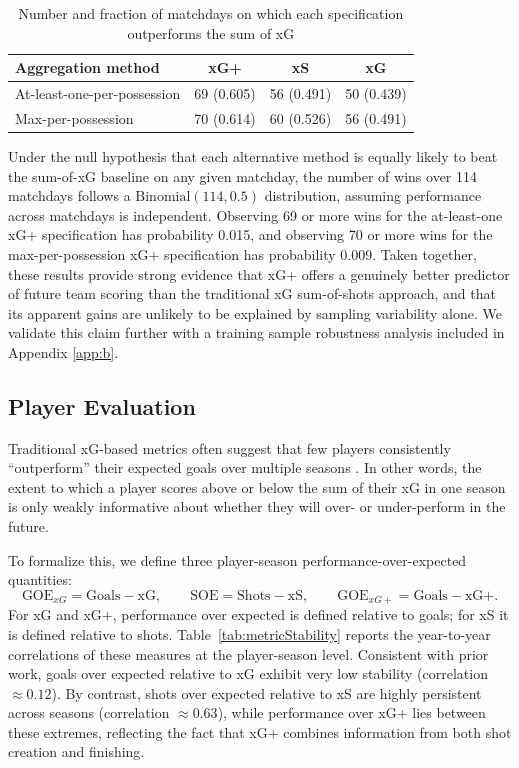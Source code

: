 \documentclass[12pt,letterpaper]{article}
\begin{document}
\begin{table}[ht]
\centering
\caption{Number and fraction of matchdays on which each specification outperforms the sum of xG}
\label{tab:fraction_better_than_xGsum}
\begin{tabular}{lccc}
\toprule
\textbf{Aggregation method} & \textbf{xG+} & \textbf{xS} & \textbf{xG} \\
\midrule
At-least-one-per-possession & 69 (0.605) & 56 (0.491) & 50 (0.439) \\
Max-per-possession          & 70 (0.614) & 60 (0.526) & 56 (0.491) \\
\bottomrule
\end{tabular}
\end{table}


Under the null hypothesis that each alternative method is equally likely to beat the sum-of-xG baseline on any given matchday, the number of wins over 114 matchdays follows a $\text{Binomial}(114, 0.5)$ distribution, assuming performance across matchdays is independent. Observing 69 or more wins for the at-least-one xG+ specification has probability 0.015, and observing 70 or more wins for the max-per-possession xG+ specification has probability 0.009. Taken together, these results provide strong evidence that xG+ offers a genuinely better predictor of future team scoring than the traditional xG sum-of-shots approach, and that its apparent gains are unlikely to be explained by sampling variability alone. We validate this claim further with a training sample robustness analysis included in Appendix \ref{app:b}.

\subsection{Player Evaluation}

Traditional xG-based metrics often suggest that few players consistently ``outperform'' their expected goals over multiple seasons \citep{goodman2014finishing,statsbomb2017finishing,davis2024biases}. In other words, the extent to which a player scores above or below the sum of their xG in one season is only weakly informative about whether they will over- or under-perform in the future. 

To formalize this, we define three player-season performance-over-expected quantities:
\[
\text{GOE}_{xG} = \text{Goals} - \text{xG}, \qquad
\text{SOE} = \text{Shots} - \text{xS}, \qquad
\text{GOE}_{xG+} = \text{Goals} - \text{xG+}.
\]
For xG and xG+, performance over expected is defined relative to goals; for xS it is defined relative to shots. Table~\ref{tab:metricStability} reports the year-to-year correlations of these measures at the player-season level. Consistent with prior work, goals over expected relative to xG exhibit very low stability (correlation $\approx 0.12$). By contrast, shots over expected relative to xS are highly persistent across seasons (correlation $\approx 0.63$), while performance over xG+ lies between these extremes, reflecting the fact that xG+ combines information from both shot creation and finishing.
\end{document}
